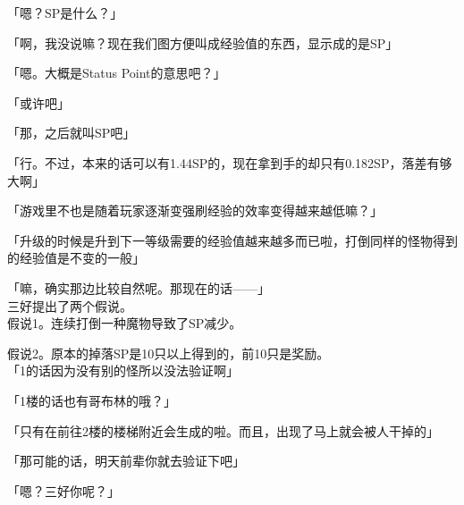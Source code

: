 「嗯？SP是什么？」

「啊，我没说嘛？现在我们图方便叫成经验值的东西，显示成的是SP」

「嗯。大概是Status Point的意思吧？」

「或许吧」

「那，之后就叫SP吧」

「行。不过，本来的话可以有1.44SP的，现在拿到手的却只有0.182SP，落差有够大啊」

「游戏里不也是随着玩家逐渐变强刷经验的效率变得越来越低嘛？」

「升级的时候是升到下一等级需要的经验值越来越多而已啦，打倒同样的怪物得到的经验值是不变的一般」

「嘛，确实那边比较自然呢。那现在的话——」\\

三好提出了两个假说。\\

假说1。连续打倒一种魔物导致了SP减少。

假说2。原本的掉落SP是10只以上得到的，前10只是奖励。\\

「1的话因为没有别的怪所以没法验证啊」

「1楼的话也有哥布林的哦？」

「只有在前往2楼的楼梯附近会生成的啦。而且，出现了马上就会被人干掉的」

「那可能的话，明天前辈你就去验证下吧」

「嗯？三好你呢？」

